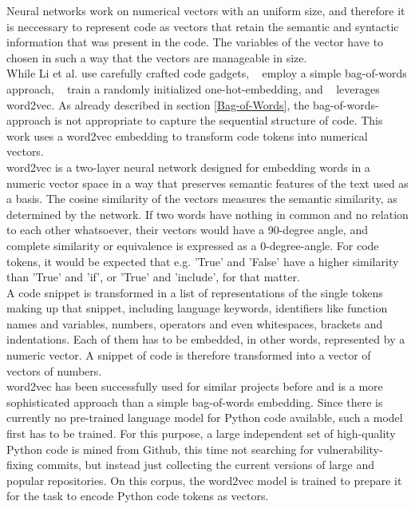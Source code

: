 \documentclass[
	a4paper,
	pagesize,
	pdftex,
	12pt,
	twoside, %
	BCOR=5mm, %
	ngerman,
	fleqn,
	final,
	]{scrartcl}
\begin{document}
Neural networks work on numerical vectors with an uniform size, and therefore it is neccessary to represent code as vectors that retain the semantic and syntactic information that was present in the code. The variables of the vector have to chosen in such a way that the vectors are manageable in size.\\
While Li et al.\cite{Li.2018} use carefully crafted code gadgets, ~\cite{Hovsepyan.2012} employ a simple bag-of-words approach, ~\cite{Russell.2018} train a randomly initialized one-hot-embedding, and ~\cite{Liu.2018} leverages word2vec. As already described in section \ref{Bag-of-Words}, the bag-of-words-approach is not appropriate to capture the sequential structure of code. This work uses a word2vec embedding to transform code tokens into numerical vectors.\\
word2vec is a two-layer neural network designed for embedding words in a numeric vector space in a way that preserves semantic features of the text used as a basis. The cosine similarity of the vectors measures the semantic similarity, as determined by the network. If two words have nothing in common and no relation to each other whatsoever, their vectors would have a 90-degree angle, and complete similarity or equivalence is expressed as a 0-degree-angle. For code tokens, it would be expected that e.g. 'True' and 'False' have a higher similarity than 'True' and 'if', or 'True' and 'include', for that matter.\\
A code snippet is transformed in a list of representations of the single tokens making up that snippet, including language keywords, identifiers like function names and variables, numbers, operators and even whitespaces, brackets and indentations. Each of them has to be embedded, in other words, represented by a numeric vector. A snippet of code is therefore transformed into a vector of vectors of numbers.\\
word2vec has been successfully used for similar projects before \cite{Liu.2018} and is a more sophisticated approach than a simple bag-of-words embedding. Since there is currently no pre-trained language model for Python code available, such a model first has to be trained. For this purpose, a large independent set of high-quality Python code is mined from Github, this time not searching for vulnerability-fixing commits, but instead just collecting the current versions of large and popular repositories. On this corpus, the word2vec model is trained to prepare it for the task to encode Python code tokens as vectors.
\end{document}
